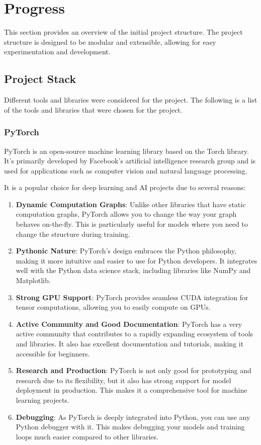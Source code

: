 \section{Progress}
This section provides an overview of the initial project structure. The project structure is designed to be modular and extensible, allowing for easy experimentation and development.

\subsection{Project Stack}
Different tools and libraries were considered for the project. The following is a list of the tools and libraries that were chosen for the project.

\subsubsection{PyTorch}
PyTorch is an open-source machine learning library based on the Torch library. It's primarily developed by Facebook's artificial intelligence research group and is used for applications such as computer vision and natural language processing.

It is a popular choice for deep learning and AI projects due to several reasons:
\begin{enumerate}
    \item \textbf{Dynamic Computation Graphs}: Unlike other libraries that have static computation graphs, PyTorch allows you to change the way your graph behaves on-the-fly. This is particularly useful for models where you need to change the structure during training.
    \item \textbf{Pythonic Nature}: PyTorch's design embraces the Python philosophy, making it more intuitive and easier to use for Python developers. It integrates well with the Python data science stack, including libraries like NumPy and Matplotlib.
    \item \textbf{Strong GPU Support}: PyTorch provides seamless CUDA integration for tensor computations, allowing you to easily compute on GPUs.
    \item \textbf{Active Community and Good Documentation}: PyTorch has a very active community that contributes to a rapidly expanding ecosystem of tools and libraries. It also has excellent documentation and tutorials, making it accessible for beginners.
    \item \textbf{Research and Production}: PyTorch is not only good for prototyping and research due to its flexibility, but it also has strong support for model deployment in production. This makes it a comprehensive tool for machine learning projects.
    \item \textbf{Debugging}: As PyTorch is deeply integrated into Python, you can use any Python debugger with it. This makes debugging your models and training loops much easier compared to other libraries.
\end{enumerate}

